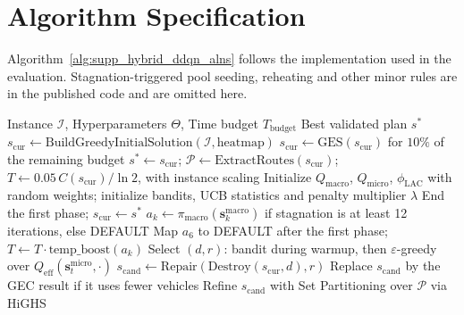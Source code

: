 \documentclass{article}
\begin{document}
\section{Algorithm Specification}
\label{sec:supp_full_algorithm}

Algorithm~\ref{alg:supp_hybrid_ddqn_alns} follows the implementation used in the evaluation. Stagnation-triggered pool seeding, reheating and other minor rules are in the published code and are omitted here.

\begin{algorithm}[!htbp]
\caption{Tri-Level Hybrid DDQN-ALNS for VRPTW}
\label{alg:supp_hybrid_ddqn_alns}
\footnotesize
\begin{algorithmic}[1]
\Require Instance $\mathcal{I}$, Hyperparameters $\Theta$, Time budget $T_{\text{budget}}$
\Ensure Best validated plan $s^*$
\State $s_{\text{cur}} \leftarrow \text{BuildGreedyInitialSolution}(\mathcal{I}, \text{heatmap})$
    \State $s_{\text{cur}} \leftarrow \text{GES}(s_{\text{cur}})$ for $10\%$ of the remaining budget
\EndIf
\State $s^* \leftarrow s_{\text{cur}}$; $\mathcal{P} \leftarrow \text{ExtractRoutes}(s_{\text{cur}})$; $T \leftarrow 0.05\,C(s_{\text{cur}}) / \ln 2$, with instance scaling
\State Initialize $Q_{\text{macro}}$, $Q_{\text{micro}}$, $\phi_{\text{LAC}}$ with random weights; initialize bandits, UCB statistics and penalty multiplier $\lambda$
        \State End the first phase; $s_{\text{cur}} \leftarrow s^*$
    \EndIf
    \State $a_k \leftarrow \pi_{\text{macro}}(\mathbf{s}_k^{\text{macro}})$ if stagnation is at least 12 iterations, else \textsf{DEFAULT}
    \State Map $a_6$ to \textsf{DEFAULT} after the first phase; $T \leftarrow T \cdot \text{temp\_boost}(a_k)$
        \State Select $(d, r)$: bandit during warmup, then $\varepsilon$-greedy over $Q_{\text{eff}}(\mathbf{s}_t^{\text{micro}}, \cdot)$
        \State $s_{\text{cand}} \leftarrow \text{Repair}(\text{Destroy}(s_{\text{cur}}, d), r)$
            \State Replace $s_{\text{cand}}$ by the GEC result if it uses fewer vehicles
        \EndIf
            \State Refine $s_{\text{cand}}$ with Set Partitioning over $\mathcal{P}$ via HiGHS

\end{algorithmic}
\end{algorithm}
\end{document}
